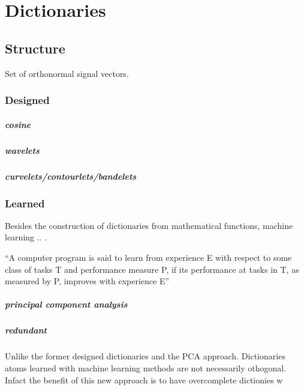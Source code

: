 \chapter{Dictionaries}
\thispagestyle{empty}

\section{Structure}
Set of orthonormal signal vectors.
\subsection{Designed}

\paragraph{cosine}
\paragraph{wavelets}
\paragraph{curvelets/contourlets/bandelets}


\subsection{Learned}


Besides the construction of dictionaries from mathematical functions, machine learning .. .


``A computer program is said to learn from experience E with respect to some class of tasks T and performance measure P, if its performance at tasks in T, as measured by P, improves with experience E''


\paragraph{principal component analysis}


\paragraph{redundant}
Unlike the former designed dictionaries and the PCA approach. Dictionaries atoms learned with machine learning methods are not necessarily othogonal.
Infact the benefit of this new approach is to have overcomplete dictionies w



